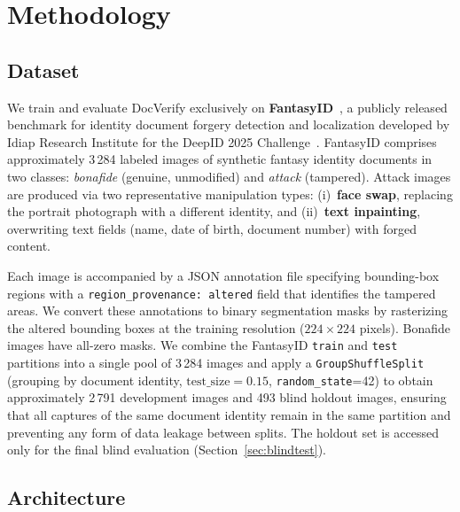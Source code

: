 
\section{Methodology}
\label{sec:method}

\subsection{Dataset}
\label{subsec:dataset}

We train and evaluate DocVerify exclusively on \textbf{FantasyID}~\cite{fantasyid2024},
a publicly released benchmark for identity document forgery detection and
localization developed by Idiap Research Institute for the DeepID 2025
Challenge~\cite{deepid2025challenge}. FantasyID comprises approximately 3\,284
labeled images of synthetic fantasy identity documents in two classes: \textit{bonafide}
(genuine, unmodified) and \textit{attack} (tampered). Attack images are produced
via two representative manipulation types: (i)~\textbf{face swap}, replacing the
portrait photograph with a different identity, and (ii)~\textbf{text inpainting},
overwriting text fields (name, date of birth, document number) with forged content.

Each image is accompanied by a JSON annotation file specifying bounding-box
regions with a \texttt{region\allowbreak\_provenance:\allowbreak~altered} field that identifies the
tampered areas. We convert these annotations to binary segmentation masks by
rasterizing the altered bounding boxes at the training resolution
($224 \times 224$ pixels). Bonafide images have all-zero masks. We combine the FantasyID \texttt{train}
and \texttt{test} partitions into a single pool of 3\,284 images and apply a
\texttt{GroupShuffleSplit} (grouping by document identity, $\text{test\_size}=0.15$,
\texttt{random\_state}=42) to obtain approximately 2\,791 development images and
493 blind holdout images, ensuring that all captures of the same document identity
remain in the same partition and preventing any form of data leakage between splits. The holdout set is accessed only for the final blind
evaluation (Section~\ref{sec:blindtest}).

\subsection{Architecture}
\label{subsec:arch}

